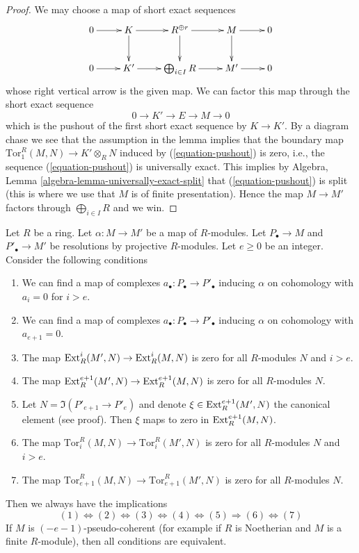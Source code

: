 \begin{proof}
We may choose a map of short exact sequences
$$
\xymatrix{
0 \ar[r] &
K \ar[r] \ar[d] &
R^{\oplus r} \ar[r] \ar[d] &
M \ar[r] \ar[d] &
0 \\
0 \ar[r] &
K' \ar[r] &
\bigoplus_{i \in I} R \ar[r] &
M' \ar[r] &
0
}
$$
whose right vertical arrow is the given map.
We can factor this map through the short exact sequence
\begin{equation}
\label{equation-pushout}
0 \to K' \to E \to M \to 0
\end{equation}
which is the pushout of the first short exact sequence by $K \to K'$.
By a diagram chase we see that the assumption in the lemma
implies that the boundary map $\text{Tor}_1^R(M, N) \to K' \otimes_R N$
induced by (\ref{equation-pushout}) is zero, i.e., the sequence
(\ref{equation-pushout}) is universally exact. This implies by
Algebra, Lemma \ref{algebra-lemma-universally-exact-split}
that (\ref{equation-pushout}) is split (this is where we use that
$M$ is of finite presentation). Hence the map $M \to M'$
factors through $\bigoplus_{i \in I} R$ and we win.
\end{proof}

\begin{lemma}
\label{lemma-characterize-vanishing-tor-ext-above-e}
Let $R$ be a ring. Let $\alpha : M \to M'$ be a map of $R$-modules.
Let $P_\bullet \to M$ and $P'_\bullet \to M'$ be resolutions by
projective $R$-modules. Let $e \geq 0$ be an integer.
Consider the following conditions
\begin{enumerate}
\item We can find a map of complexes $a_\bullet : P_\bullet \to P'_\bullet$
inducing $\alpha$ on cohomology with $a_i = 0$ for $i > e$.
\item We can find a map of complexes $a_\bullet : P_\bullet \to P'_\bullet$
inducing $\alpha$ on cohomology with $a_{e + 1} = 0$.
\item The map $\mathop{\mathrm{Ext}}\nolimits^i_R(M', N) \to \mathop{\mathrm{Ext}}\nolimits^i_R(M, N)$ is zero
for all $R$-modules $N$ and $i > e$.
\item The map $\mathop{\mathrm{Ext}}\nolimits^{e + 1}_R(M', N) \to \mathop{\mathrm{Ext}}\nolimits^{e + 1}_R(M, N)$ is zero
for all $R$-modules $N$.
\item Let $N = \Im(P'_{e + 1} \to P'_e)$ and denote
$\xi \in \mathop{\mathrm{Ext}}\nolimits^{e + 1}_R(M', N)$ the canonical element (see proof).
Then $\xi$ maps to zero in $\mathop{\mathrm{Ext}}\nolimits^{e + 1}_R(M, N)$.
\item The map $\text{Tor}_i^R(M, N) \to \text{Tor}_i^R(M', N)$
is zero for all $R$-modules $N$ and $i > e$.
\item The map $\text{Tor}_{e + 1}^R(M, N) \to \text{Tor}_{e + 1}^R(M', N)$
is zero for all $R$-modules $N$.
\end{enumerate}
Then we always have the implications
$$
(1) \Leftrightarrow (2) \Leftrightarrow (3) \Leftrightarrow (4)
\Leftrightarrow (5) \Rightarrow (6) \Leftrightarrow (7)
$$
If $M$ is $(-e - 1)$-pseudo-coherent (for example if $R$ is Noetherian
and $M$ is a finite $R$-module), then all conditions
are equivalent.
\end{lemma}

